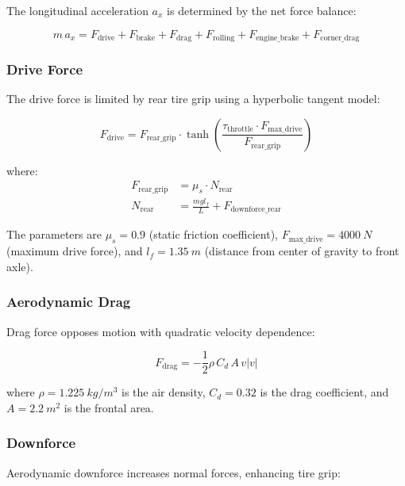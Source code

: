 \documentclass[11pt,a4paper]{article}
\begin{document}
The longitudinal acceleration $a_x$ is determined by the net force balance:

\begin{equation}
m \, a_x = F_{\text{drive}} + F_{\text{brake}} + F_{\text{drag}} + F_{\text{rolling}} + F_{\text{engine\_brake}} + F_{\text{corner\_drag}}
\end{equation}

\subsubsection{Drive Force}

The drive force is limited by rear tire grip using a hyperbolic tangent model:

\begin{equation}
F_{\text{drive}} = F_{\text{rear\_grip}} \cdot \tanh\left(\frac{\tau_{\text{throttle}} \cdot F_{\text{max\_drive}}}{F_{\text{rear\_grip}}}\right)
\end{equation}

where:
\begin{align}
F_{\text{rear\_grip}} &= \mu_s \cdot N_{\text{rear}} \\
N_{\text{rear}} &= \frac{m g l_f}{L} + F_{\text{downforce\_rear}}
\end{align}

The parameters are $\mu_s = 0.9$ (static friction coefficient), $F_{\text{max\_drive}} = \SI{4000}{N}$ (maximum drive force), and $l_f = \SI{1.35}{m}$ (distance from center of gravity to front axle).

\subsubsection{Aerodynamic Drag}

Drag force opposes motion with quadratic velocity dependence:

\begin{equation}
F_{\text{drag}} = -\frac{1}{2} \rho \, C_d \, A \, v |v|
\end{equation}

where $\rho = \SI{1.225}{kg/m^3}$ is the air density, $C_d = 0.32$ is the drag coefficient, and $A = \SI{2.2}{m^2}$ is the frontal area.

\subsubsection{Downforce}

Aerodynamic downforce increases normal forces, enhancing tire grip:
\end{document}

